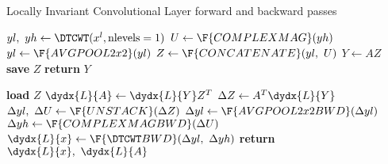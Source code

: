 \begin{algorithm}[tb]
\caption{Locally Invariant Convolutional Layer forward and backward
passes}\label{alg:ch5:inv}
\begin{algorithmic}[1]
  \State $yl,\ yh \gets \DTCWT(x^l, \mbox{nlevels}=1) $ 
  \State $U \gets \F{COMPLEXMAG}(yh)$
  \State $yl \gets \F{AVGPOOL2x2}(yl)$  
  \State $Z \gets \F{CONCATENATE}(yl,\ U)$ 
  \State $Y \gets AZ$ 
  \State \textbf{save} $Z$ 
  \State \textbf{return} $Y$ 
\EndProcedure
\end{algorithmic}\vspace{10pt}
\begin{algorithmic}[1]
  \State \textbf{load} $Z$
  \State $\dydx{L}{A} \gets \dydx{L}{Y} Z^T$ 
  \State $\Delta{Z} \gets A^T\dydx{L}{Y}$
  \State $\Delta yl,\ \Delta U \gets \F{UNSTACK}(\Delta Z)$ 
  \State $\Delta yl \gets \F{AVGPOOL2x2BWD}(\Delta yl)$
  \State $\Delta yh \gets \F{COMPLEXMAGBWD}(\Delta U)$
  \State $\dydx{L}{x} \gets \F{\DTCWT BWD}(\Delta yl,\ \Delta yh)$ 
  \State \textbf{return} $\dydx{L}{x},\ \dydx{L}{A}$
\EndProcedure
\end{algorithmic}
\end{algorithm}


